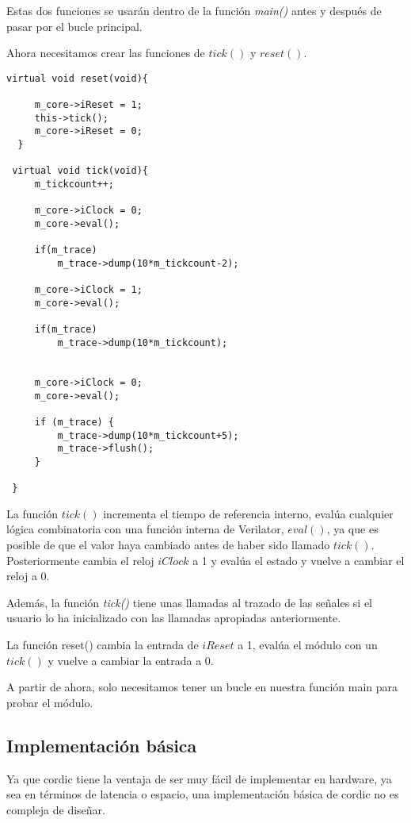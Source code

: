 Estas dos funciones se usarán dentro de la función \textit{main()} antes y después de pasar por el bucle principal.

Ahora necesitamos crear las funciones de $tick()$ y $reset()$.

\begin{lstlisting}[caption={Definición de funciones \textit{reset()} y \textit{tick()}}]
  virtual void reset(void){

     m_core->iReset = 1;
     this->tick();
     m_core->iReset = 0;
  }

 virtual void tick(void){
     m_tickcount++;

     m_core->iClock = 0;
     m_core->eval();
     
     if(m_trace) 
         m_trace->dump(10*m_tickcount-2);

     m_core->iClock = 1;
     m_core->eval();
     
     if(m_trace)
         m_trace->dump(10*m_tickcount);
     

     m_core->iClock = 0;
     m_core->eval();
     
     if (m_trace) {
         m_trace->dump(10*m_tickcount+5);
         m_trace->flush();
     }
     
 }
\end{lstlisting}

La función $tick()$ incrementa el tiempo de referencia interno, evalúa cualquier lógica combinatoria con una función interna de Verilator, $eval()$, ya que es posible de que el valor haya cambiado antes de haber sido llamado $tick()$. Posteriormente cambia el reloj $iClock$ a 1 y evalúa el estado y vuelve a cambiar el reloj a 0.

Además, la función \textit{tick()} tiene unas llamadas al trazado de las señales si el usuario lo ha inicializado con las llamadas apropiadas anteriormente.

La función reset() cambia la entrada de $iReset$ a 1, evalúa el módulo con un $tick()$ y vuelve a cambiar la entrada a 0.

A partir de ahora, solo necesitamos tener un bucle en nuestra función main para probar el módulo.

\subsection{Implementación básica}
Ya que \gls{cordic} tiene la ventaja de ser muy fácil de implementar en hardware, ya sea en términos de latencia o espacio, una implementación básica de \gls{cordic} no es compleja de diseñar.

